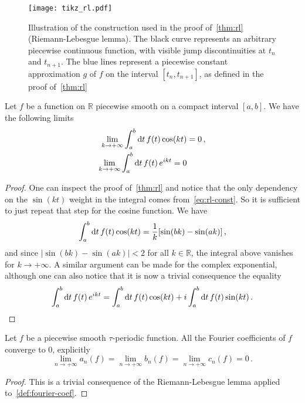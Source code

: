 \begin{figure}[t]
  \centering
  \texttt{[image: tikz\_rl.pdf]}
  \caption{Illustration of the construction used in the proof of~\cref{thm:rl}
    (Riemann-Lebesgue lemma). The black curve represents an arbitrary piecewise continuous
    function, with visible jump discontinuities at $t_n$ and $t_{n+1}$. The blue lines
    represent a piecewise constant approximation $g$ of $f$ on the interval
  $[t_n,t_{n+1}]$, as defined in the proof of~\cref{thm:rl}}
  \label{fig:rl}
\end{figure}
\begin{corollary}
  Let $f$ be a function on $\mathbb{R}$ piecewise smooth on a compact interval $[a,b]$. We
  have the following limits
  \begin{align}
    \lim_{k\to+\infty}\int_a^b\mathrm{d} t\, f(t)\cos(kt)&=0\,,\\
    \lim_{k\to+\infty}\int_a^b\mathrm{d} t\, f(t)\,e^{ikt}=0
  \end{align}
\end{corollary}
\begin{proof}
  One can inspect the proof of~\cref{thm:rl} and notice that the only dependency on the
  $\sin(kt)$ weight in the integral comes from~\cref{eq:rl-const}. So it is sufficient to
  just repeat that step for the cosine function. We have
  \begin{equation}
    \int_a^b\mathrm{d} t\, f(t)\cos(kt)=\frac{1}{k}[\sin(bk)-\sin(ak)]\,,
  \end{equation}
  and since $|\sin(bk)-\sin(ak)|<2$ for all $k\in\mathbb{R}$, the integral above vanishes
  for $k\to+\infty$. A similar argument can be made for the complex exponential, although
  one can also notice that it is now a trivial consequence the equality
  \begin{equation}
    \int_a^b\mathrm{d} t\, f(t)\,e^{ikt}
    =\int_a^b\mathrm{d} t\, f(t)\cos(kt)+i\int_a^b\mathrm{d} t\, f(t)\sin(kt)\,.
  \end{equation}
\end{proof}
\begin{corollary}
  Let $f$ be a piecewise smooth $\tau$-periodic function. All the Fourier coefficients of
  $f$ converge to $0$, explicitly
  \begin{equation}
    \lim_{n\to+\infty}a_n(f)=\lim_{n\to+\infty}b_n(f)=\lim_{n\to+\infty}c_n(f)=0\,.
  \end{equation}
\end{corollary}
\begin{proof}
  This is a trivial consequence of the Riemann-Lebesgue lemma applied
  to~\cref{def:fourier-coef}.
\end{proof}
